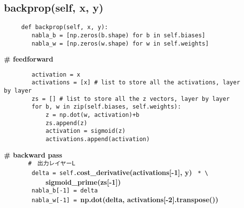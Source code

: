 \documentclass[11pt,a4j,fleqn]{jarticle}
\begin{document}
\subsection{backprop(self, x, y)}
\begin{verbatim}
     def backprop(self, x, y):
        nabla_b = [np.zeros(b.shape) for b in self.biases]
        nabla_w = [np.zeros(w.shape) for w in self.weights]
\end{verbatim}

        {\Large \bf \# feedforward}
\begin{verbatim}
        activation = x
        activations = [x] # list to store all the activations, layer by layer
        zs = [] # list to store all the z vectors, layer by layer
        for b, w in zip(self.biases, self.weights):
            z = np.dot(w, activation)+b
            zs.append(z)
            activation = sigmoid(z)
            activations.append(activation)
\end{verbatim}

        {\Large \bf \# backward pass}\\
\verb|　　　  #　出力レイヤーL|\\
\verb|        delta = self.|{\Large \bf cost\_derivative(activations[-1], y)} \verb| * \|\\
\verb|            |{\Large \bf sigmoid\_prime(zs[-1])}\\
\verb|        nabla_b[-1] = delta|\\
\verb|        nabla_w[-1] = |{\Large \bf np.dot(delta, activations[-2].transpose())}\\
\end{document}
